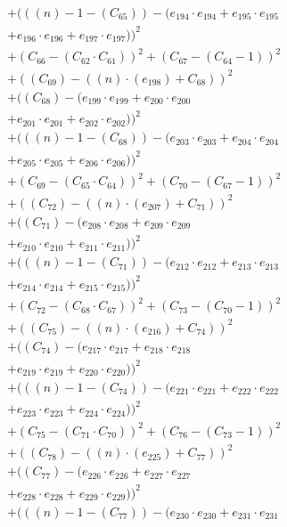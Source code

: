 \documentclass[10pt, a4paper]{article}
\begin{document}
\begin{align*}
& + (((n) - 1 - (C_{65})) - (e_{194} \cdot e_{194} + e_{195} \cdot e_{195} \\
& + e_{196} \cdot e_{196} + e_{197} \cdot e_{197}))^{2} \\
& + (C_{66} - (C_{62}  \cdot  C_{61}))^{2} + (C_{67} - (C_{64} - 1))^{2} \\
& + ((C_{69}) - ((n)  \cdot  (e_{198}) + C_{68}))^{2} \\
& + ((C_{68}) - (e_{199} \cdot e_{199} + e_{200} \cdot e_{200} \\
& + e_{201} \cdot e_{201} + e_{202} \cdot e_{202}))^{2} \\
& + (((n) - 1 - (C_{68})) - (e_{203} \cdot e_{203} + e_{204} \cdot e_{204} \\
& + e_{205} \cdot e_{205} + e_{206} \cdot e_{206}))^{2} \\
& + (C_{69} - (C_{65}  \cdot  C_{64}))^{2} + (C_{70} - (C_{67} - 1))^{2} \\
& + ((C_{72}) - ((n)  \cdot  (e_{207}) + C_{71}))^{2} \\
& + ((C_{71}) - (e_{208} \cdot e_{208} + e_{209} \cdot e_{209} \\
& + e_{210} \cdot e_{210} + e_{211} \cdot e_{211}))^{2} \\
& + (((n) - 1 - (C_{71})) - (e_{212} \cdot e_{212} + e_{213} \cdot e_{213} \\
& + e_{214} \cdot e_{214} + e_{215} \cdot e_{215}))^{2} \\
& + (C_{72} - (C_{68}  \cdot  C_{67}))^{2} + (C_{73} - (C_{70} - 1))^{2} \\
& + ((C_{75}) - ((n)  \cdot  (e_{216}) + C_{74}))^{2} \\
& + ((C_{74}) - (e_{217} \cdot e_{217} + e_{218} \cdot e_{218} \\
& + e_{219} \cdot e_{219} + e_{220} \cdot e_{220}))^{2} \\
& + (((n) - 1 - (C_{74})) - (e_{221} \cdot e_{221} + e_{222} \cdot e_{222} \\
& + e_{223} \cdot e_{223} + e_{224} \cdot e_{224}))^{2} \\
& + (C_{75} - (C_{71}  \cdot  C_{70}))^{2} + (C_{76} - (C_{73} - 1))^{2} \\
& + ((C_{78}) - ((n)  \cdot  (e_{225}) + C_{77}))^{2} \\
& + ((C_{77}) - (e_{226} \cdot e_{226} + e_{227} \cdot e_{227} \\
& + e_{228} \cdot e_{228} + e_{229} \cdot e_{229}))^{2} \\
& + (((n) - 1 - (C_{77})) - (e_{230} \cdot e_{230} + e_{231} \cdot e_{231} \\

\end{align*}
\end{document}
